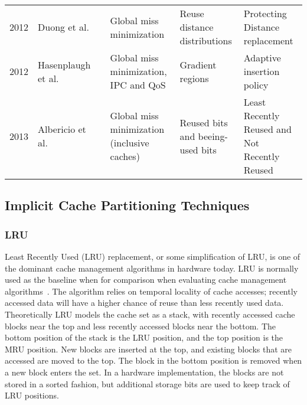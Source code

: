 \begin{table*}[tp]
\begin{tabularx}{\textwidth}{llcXXX}
    2012 & Duong et al. & \cite{duong12} & Global miss minimization & Reuse distance distributions &Protecting Distance replacement \\
    2012 & Hasenplaugh et al. & \cite{hasenplaugh12} & Global miss minimization, IPC and QoS  & Gradient regions & Adaptive insertion policy \\
    2013 & Albericio et al. & \cite{albericio13} & Global miss minimization (inclusive caches) & Reused bits and beeing-used bits & Least Recently Reused and Not Recently Reused \\
    \bottomrule
    \end{tabularx}    
\end{table*}





\subsection{Implicit Cache Partitioning Techniques}

\subsubsection{LRU}

Least Recently Used (LRU) replacement, or some simplification of LRU, is one of the dominant cache management algorithms in hardware today. 
LRU is normally used as the baseline when for comparison when evaluating cache management algorithms~\cite{Jaleel2010,Qureshi2006,Qureshi2007}.
The algorithm relies on temporal locality of cache accesses; recently accessed data will have a higher chance of reuse than less recently used data.
Theoretically LRU models the cache set as a stack, with recently accessed cache blocks near the top and less recently accessed blocks near the bottom.
The bottom position of the stack is the LRU position, and the top position is the MRU position.
New blocks are inserted at the top, and existing blocks that are accessed are moved to the top.
The block in the bottom position is removed when a new block enters the set.
In a hardware implementation, the blocks are not stored in a sorted fashion, but additional storage bits are used to keep track of LRU positions.

